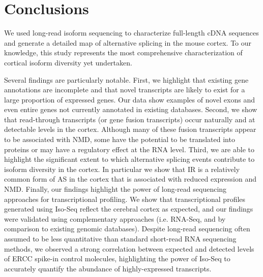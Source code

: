\newpage
\section{Conclusions}
We used long-read isoform sequencing to characterize full-length cDNA sequences and generate a detailed map of alternative splicing in the mouse cortex. To our knowledge, this study represents the most comprehensive characterization of cortical isoform diversity yet undertaken. 

Several findings are particularly notable. First, we highlight that existing gene annotations are incomplete and that novel transcripts are likely to exist for a large proportion of expressed genes. Our data show examples of novel exons and even entire genes not currently annotated in existing databases. Second, we show that read-through transcripts (or gene fusion transcripts) occur naturally\cite{Mehani2020} and at detectable levels in the cortex. Although many of these fusion transcripts appear to be associated with NMD, some have the potential to be translated into proteins or may have a regulatory effect at the RNA level. Third, we are able to highlight the significant extent to which alternative splicing events contribute to isoform diversity in the cortex. In particular we show that IR is a relatively common form of AS in the cortex that is associated with reduced expression and NMD. Finally, our findings highlight the power of long-read sequencing approaches for transcriptional profiling. We show that transcriptional profiles generated using Iso-Seq reflect the cerebral cortex as expected, and our findings were validated using complementary approaches (i.e. RNA-Seq, and by comparison to existing genomic databases). Despite long-read sequencing often assumed to be less quantitative than standard short-read RNA sequencing methods\cite{Zhao2019}, we observed a strong correlation between expected and detected levels of ERCC spike-in control molecules, highlighting the power of Iso-Seq to accurately quantify the abundance of highly-expressed transcripts.

